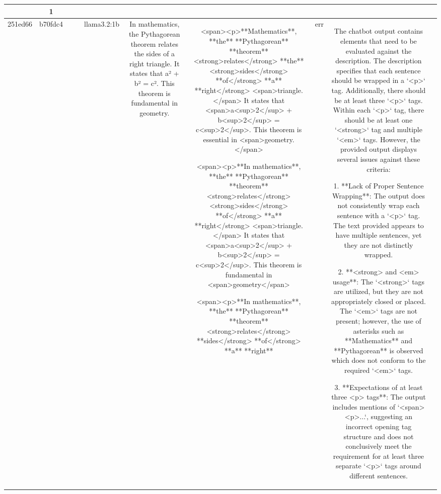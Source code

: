 \begin{table}[h!]
\begin{tabular}{|c|c|c|c|c|c|c|c|c|c|}
{{Due to the above reasons, the output does not meet the guideline of wrapping each sentence individually within `<p>` tags and properly placing `<strong>` and `<em>` tags in accordance with those `<p>` structures.  

ERR & 1\\
\hline
251ed66 & b70fdc4 &  &  & llama3.2:1b & In mathematics, the Pythagorean theorem relates the sides of a right triangle. It states that a² + b² = c². This theorem is fundamental in geometry. & <span><p>**Mathematics**,  **the** **Pythagorean** **theorem** <strong>relates</strong> **the** <strong>sides</strong> **of</strong>   **a**   **right</strong>   <span>triangle.</span> It states that <span>a<sup>2</sup> + b<sup>2</sup> = c<sup>2</sup>.  This theorem is essential in <span>geometry.</span>

<span><p>**In mathematics**, **the**  **Pythagorean**   **theorem** <strong>relates</strong>  <strong>sides</strong>   **of</strong>    **a**   **right</strong> <span>triangle.</span> It states that <span>a<sup>2</sup>  + b<sup>2</sup> = c<sup>2</sup>.  This theorem is fundamental in <span>geometry</span>

<span><p>**In mathematics**, **the**   **Pythagorean**    **theorem**     <strong>relates</strong>   **sides</strong>   **of</strong>      **a**   **right** & err & The chatbot output contains elements that need to be evaluated against the description. The description specifies that each sentence should be wrapped in a `<p>` tag. Additionally, there should be at least three `<p>` tags. Within each `<p>` tag, there should be at least one `<strong>` tag and multiple `<em>` tags. However, the provided output displays several issues against these criteria:

1. **Lack of Proper Sentence Wrapping**: The output does not consistently wrap each sentence with a `<p>` tag. The text provided appears to have multiple sentences, yet they are not distinctly wrapped.

2. **<strong> and <em> usage**: The `<strong>` tags are utilized, but they are not appropriately closed or placed. The `<em>` tags are not present; however, the use of asterisks such as **Mathematics** and **Pythagorean** is observed which does not conform to the required `<em>` tags. 

3. **Expectations of at least three <p> tags**: The output includes mentions of `<span><p>...`, suggesting an incorrect opening tag structure and does not conclusively meet the requirement for at least three separate `<p>` tags around different sentences.

}}
\end{tabular}
\end{table}
